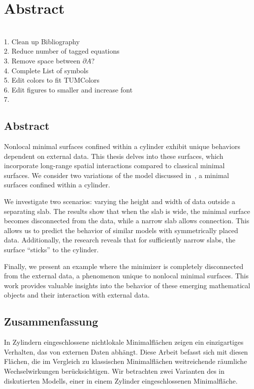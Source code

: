 \chapter{Abstract}
\label{ch:abstract}

\begin{TODO}~\\
    1. Clean up Bibliography\\
    2. Reduce number of tagged equations\\
    3. Remove space between \( \partial A \)?\\
    4. Complete List of symbols\\
    5. Edit colors to fit TUMColors\\
    6. Edit figures to smaller and increase font\\
    7. 
\end{TODO}

\section*{Abstract}
Nonlocal minimal surfaces confined within a cylinder exhibit unique behaviors dependent on
external data. This thesis delves into these surfaces, which incorporate long-range
spatial interactions compared to classical minimal surfaces. We consider two variations of
the model discussed in~\cite{dipierro2020disconnectedness}, a minimal surfaces confined
within a cylinder.\newline

We investigate two scenarios: varying the height and width of data outside a separating
slab. The results show that when the slab is wide, the minimal surface becomes
disconnected from the data, while a narrow slab allows connection. This allows us to
predict the behavior of similar models with symmetrically placed data. Additionally, the
research reveals that for sufficiently narrow slabs, the surface \enquote{sticks} to the
cylinder.\newline 

Finally, we present an example where the minimizer is completely disconnected from the
external data, a phenomenon unique to nonlocal minimal surfaces. This work provides
valuable insights into the behavior of these emerging mathematical objects and their
interaction with external data.


\section*{Zusammenfassung}
In Zylindern eingeschlossene nichtlokale Minimalflächen zeigen ein einzigartiges
Verhalten, das von externen Daten abhängt. Diese Arbeit befasst sich mit diesen Flächen,
die im Vergleich zu klassischen Minimalflächen weitreichende räumliche Wechselwirkungen
berücksichtigen. Wir betrachten zwei Varianten des in~\cite{dipierro2020disconnectedness}
diskutierten Modells, einer in einem Zylinder eingeschlossenen Minimalfläche.\newline

